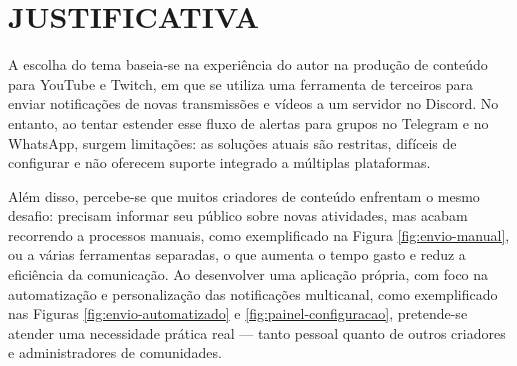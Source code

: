 
\section{JUSTIFICATIVA}
\label{sec:justificativa}







A escolha do tema baseia‑se na experiência do autor na produção de conteúdo para YouTube e Twitch, em que se utiliza uma ferramenta de terceiros para enviar notificações de novas transmissões e vídeos a um servidor no Discord. No entanto, ao tentar estender esse fluxo de alertas para grupos no Telegram e no WhatsApp, surgem limitações: as soluções atuais são restritas, difíceis de configurar e não oferecem suporte integrado a múltiplas plataformas.

Além disso, percebe-se que muitos criadores de conteúdo enfrentam o mesmo desafio: precisam informar seu público sobre novas atividades, mas acabam recorrendo a processos manuais, como exemplificado na Figura \ref{fig:envio-manual}, ou a várias ferramentas separadas, o que aumenta o tempo gasto e reduz a eficiência da comunicação. Ao desenvolver uma aplicação própria, com foco na automatização e personalização das notificações multicanal, como exemplificado nas Figuras \ref{fig:envio-automatizado} e \ref{fig:painel-configuracao}, pretende-se atender uma necessidade prática real — tanto pessoal quanto de outros criadores e administradores de comunidades.

